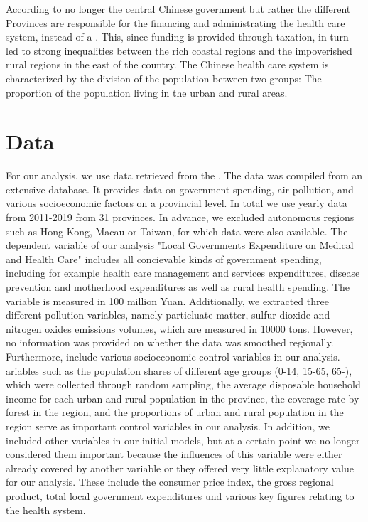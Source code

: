 \documentclass[
]{article}
\begin{document}
	According to \textcite{hougaard_chinese_2011} no longer the central Chinese government but rather the different Provinces are responsible for the financing and administrating the health care system, instead of a . This, since funding is provided through taxation, in turn led to strong inequalities between the rich coastal regions and the impoverished rural regions in the east of the country. The Chinese health care system is characterized by the division of the population between two groups: The proportion of the population living in the urban and rural areas. 
	
	
	
	\section{Data} \label{Data}
	
	For our analysis, we use data retrieved from the \cite{NBSChina}. The data was compiled from an extensive database. It provides data on government spending, air pollution, and various socioeconomic factors on a provincial level. In total we use yearly data from 2011-2019 from 31 provinces. In advance, we excluded autonomous regions such as Hong Kong, Macau or Taiwan, for which data were also available. The dependent variable of our analysis "Local Governments Expenditure on Medical and Health Care" includes all concievable kinds of government spending, including for example health care management and services expenditures, disease prevention and motherhood expenditures as well as rural health spending. The variable is measured in 100 million Yuan. Additionally, we extracted three different pollution variables, namely particluate matter, sulfur dioxide and nitrogen oxides emissions volumes, which are measured in 10000 tons. However, no information was provided on whether the data was smoothed regionally. Furthermore, include various socioeconomic control variables in our analysis. ariables such as the population shares of different age groups (0-14, 15-65, 65-), which were collected through random sampling, the average disposable household income for each urban and rural population in the province, the coverage rate by forest in the region, and the proportions of urban and rural population in the region serve as important control variables in our analysis. 
	In addition, we included other variables in our initial models, but at a certain point we no longer considered them important because the influences of this variable were either already covered by another variable or they offered very little explanatory value for our analysis. These include the consumer price index, the gross regional product, total local government expenditures und various key figures relating to the health system.
	
\end{document}

